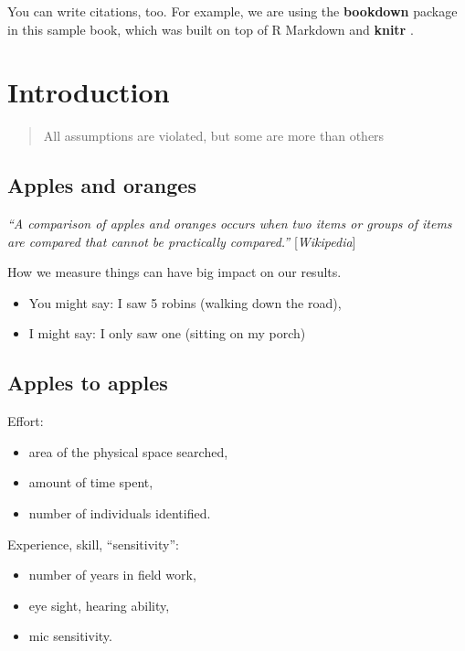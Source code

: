 \documentclass[12pt,]{book}
\providecommand{\tightlist}{%
  \setlength{\itemsep}{0pt}\setlength{\parskip}{0pt}}
\begin{document}
You can write citations, too. For example, we are using the \textbf{bookdown} package \citep{R-bookdown} in this sample book, which was built on top of R Markdown and \textbf{knitr} \citep{xie2015}.

\hypertarget{intro}{%
\chapter{Introduction}\label{intro}}

\begin{quote}
All assumptions are violated, but some are more than others
\end{quote}

\hypertarget{apples-and-oranges}{%
\section{Apples and oranges}\label{apples-and-oranges}}

\emph{``A comparison of apples and oranges occurs when two items or groups of items are compared that
cannot be practically compared.''} {[}\emph{Wikipedia}{]}

How we measure things can have big impact on our results.

\begin{itemize}
\tightlist
\item
  You might say: I saw 5 robins (walking down the road),
\item
  I might say: I only saw one (sitting on my porch)
\end{itemize}

\hypertarget{apples-to-apples}{%
\section{Apples to apples}\label{apples-to-apples}}

Effort:

\begin{itemize}
\tightlist
\item
  area of the physical space searched,
\item
  amount of time spent,
\item
  number of individuals identified.
\end{itemize}

Experience, skill, ``sensitivity'':

\begin{itemize}
\tightlist
\item
  number of years in field work,
\item
  eye sight, hearing ability,
\item
  mic sensitivity.
\end{itemize}
\end{document}
